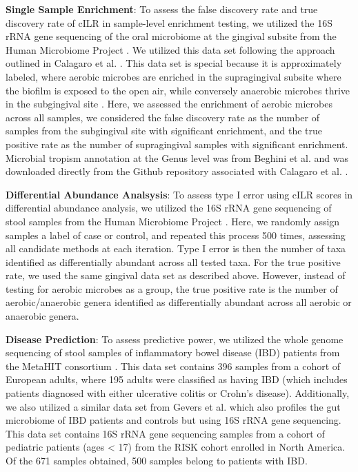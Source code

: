 \documentclass{article}
\begin{document}
\noindent \textbf{Single Sample Enrichment}: To assess the false discovery rate and true discovery rate of cILR in sample-level enrichment testing, we utilized the 16S rRNA gene sequencing of the oral microbiome at the gingival subsite from the Human Microbiome Project \cite{consortium2012, proctor2019}. We utilized this data set following the approach outlined in Calagaro et al. \cite{calgaro2020}. This data set is special because it is approximately labeled, where aerobic microbes are enriched in the supragingival subsite where the biofilm is exposed to the open air, while conversely anaerobic microbes thrive in the subgingival site \cite{thurnheer2016}. Here, we assessed the enrichment of aerobic microbes across all samples, we considered the false discovery rate as the number of samples from the subgingival site with significant enrichment, and the true positive rate as the number of supragingival samples with significant enrichment. Microbial tropism annotation at the Genus level was from Beghini et al. \cite{beghini2019} and was downloaded directly from the Github repository associated with Calagaro et al. \cite{matteocalgaro2020}. 

\noindent \textbf{Differential Abundance Analsysis}: To assess type I error using cILR scores in differential abundance analysis, we utilized the 16S rRNA gene sequencing of stool samples from the Human Microbiome Project \cite{consortium2012, proctor2019}. Here, we randomly assign samples a label of case or control, and repeated this process 500 times, assessing all candidate methods at each iteration. Type I error is then the number of taxa identified as differentially abundant across all tested taxa. For the true positive rate, we used the same gingival data set as described above. However, instead of testing for aerobic microbes as a group, the true positive rate is the number of aerobic/anaerobic genera identified as differentially abundant across all aerobic or anaerobic genera. 

\noindent \textbf{Disease Prediction}: To assess predictive power, we utilized the whole genome sequencing of stool samples of inflammatory bowel disease (IBD) patients from the MetaHIT consortium \cite{nielsen2014}. This data set contains 396 samples from a cohort of European adults, where 195 adults were classified as having IBD (which includes patients diagnosed with either ulcerative colitis or Crohn's disease). Additionally, we also utilized a similar data set from Gevers et al. \cite{gevers2014} which also profiles the gut microbiome of IBD patients and controls but using 16S rRNA gene sequencing. This data set contains 16S rRNA gene sequencing samples from a cohort of pediatric patients (ages < 17) from the RISK cohort enrolled in North America. Of the 671 samples obtained, 500 samples belong to patients with IBD. 
\end{document}
